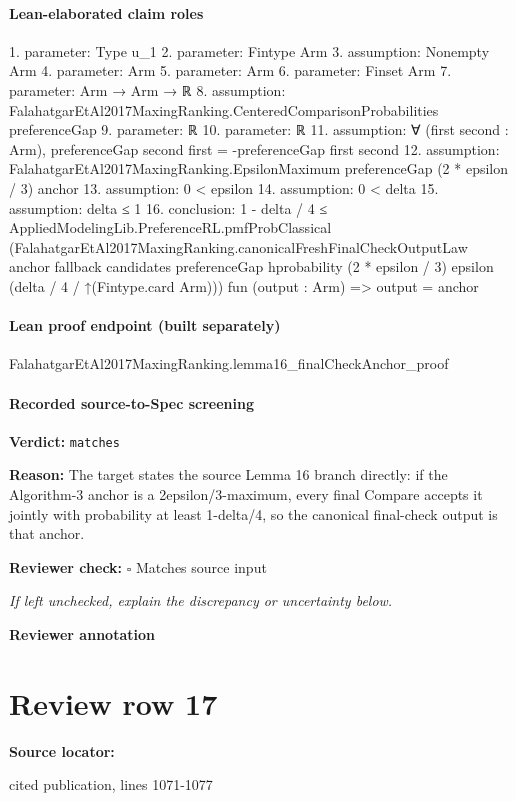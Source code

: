 \documentclass[10pt]{article}
\newcommand{\reviewerbox}{%
  \par\noindent\fbox{\parbox{0.96\linewidth}{\rule{0pt}{0.38in}}}\par
}
\newcommand{\reviewmatch}[1]{%
  \par\noindent\textbf{Reviewer check:} $\square$\; #1\par
  \noindent\emph{If left unchecked, explain the discrepancy or uncertainty below.}\par
}
\begin{document}
\paragraph{Lean-elaborated claim roles}\begin{ReviewVerbatim}
1. parameter: Type u_1
2. parameter: Fintype Arm
3. assumption: Nonempty Arm
4. parameter: Arm
5. parameter: Arm
6. parameter: Finset Arm
7. parameter: Arm → Arm → ℝ
8. assumption: FalahatgarEtAl2017MaxingRanking.CenteredComparisonProbabilities preferenceGap
9. parameter: ℝ
10. parameter: ℝ
11. assumption: ∀ (first second : Arm), preferenceGap second first = -preferenceGap first second
12. assumption: FalahatgarEtAl2017MaxingRanking.EpsilonMaximum preferenceGap (2 * epsilon / 3) anchor
13. assumption: 0 < epsilon
14. assumption: 0 < delta
15. assumption: delta ≤ 1
16. conclusion: 1 - delta / 4 ≤
  AppliedModelingLib.PreferenceRL.pmfProbClassical
    (FalahatgarEtAl2017MaxingRanking.canonicalFreshFinalCheckOutputLaw anchor fallback candidates preferenceGap
      hprobability (2 * epsilon / 3) epsilon (delta / 4 / ↑(Fintype.card Arm)))
    fun (output : Arm) => output = anchor
\end{ReviewVerbatim}

\paragraph{Lean proof endpoint (built separately)}\begin{ReviewVerbatim}
FalahatgarEtAl2017MaxingRanking.lemma16_finalCheckAnchor_proof
\end{ReviewVerbatim}

\paragraph{Recorded source-to-Spec screening}
\textbf{Verdict:} \texttt{matches}
\\
{\raggedright
\textbf{Reason:} The target states the source Lemma 16 branch directly:\allowbreak{} if the Algorithm-\allowbreak{}3 anchor is a 2epsilon/\allowbreak{}3-\allowbreak{}maximum, every final Compare accepts it jointly with probability at least 1-\allowbreak{}delta/\allowbreak{}4, so the canonical final-\allowbreak{}check output is that anchor.\allowbreak{}
\par}
\reviewmatch{Matches source input}
\noindent\textbf{Reviewer annotation}\par
\reviewerbox
\clearpage
\hypertarget{source-claim-287c18ae7ed3fbe0}{}
\section*{Review row 17}
\textbf{Source locator:} {\footnotesize\raggedright cited publication, lines 1071-\allowbreak{}1077\par}
\end{document}
